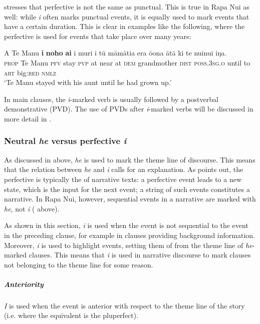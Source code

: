 \citet[17–18]{Comrie1976} stresses that perfective is not the same as punctual. This is true in Rapa Nui as well: while \textit{i} often marks punctual events, it is equally used to mark events that have a certain duration. This is clear in examples like the following, where the perfective is used for events that take place over many years:

\ea\label{ex:7.19}
\gll A Te Manu \textbf{i} \textbf{noho} \textbf{ai} {\ꞌ}i muri i tū māmātia era ō{\ꞌ}ona  {\ꞌ}ātā ki te nuinui iŋa.\\
\textsc{prop} Te Manu \textsc{pfv} stay \textsc{pvp} at near at \textsc{dem} grandmother \textsc{dist} \textsc{poss.3sg.o}  until to \textsc{art} big:\textsc{red} \textsc{nmlz}\\

\glt 
‘Te Manu stayed with his aunt until he had grown up.’ \textstyleExampleref{[R245.246]} 
\z

In main clauses, the \textit{i}{}-marked verb is usually followed by a postverbal demonstrative (PVD). The use of PVDs after \textit{i}{}-marked verbs will be discussed in more detail in . 

\subsubsection[Neutral he versus perfective i]{Neutral \textit{he} versus perfective \textit{i}}\label{sec:7.2.4.2}

As discussed in  above, \textit{he} is used to mark the theme line of discourse. This means that the relation between \textit{he} and \textit{i} calls for an explanation. As \citet[293]{Timberlake2007} points out, the perfective is typically the  of narrative texts: a perfective event leads to a new state, which is the input for the next event; a string of such events constitutes a narrative. In Rapa Nui, however, sequential events in a narrative are marked with \textit{he}, not \textit{i} ( above). 

As shown in this section, \textit{i} is used when the event is not sequential to the event in the preceding clause, for example in clauses providing background information. Moreover, \textit{i} is used to highlight events, setting them of from the theme line of \textit{he}{}-marked clauses. This means that \textit{i} is used in narrative discourse to mark clauses not belonging to the theme line for some reason. 

\subparagraph{Anteriority} \textit{I} is used when the event is anterior with respect to the theme line of the story (i.e. where the  equivalent is the pluperfect).

